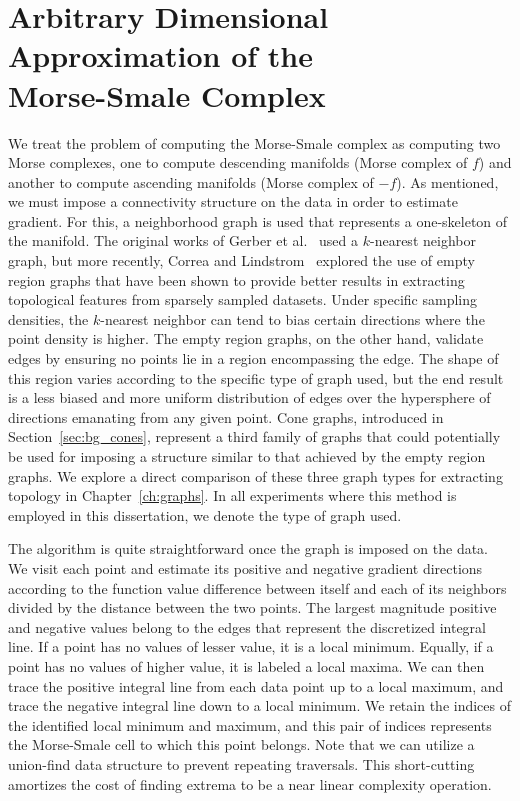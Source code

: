 \clearpage
\section{Arbitrary Dimensional Approximation of the\\Morse-Smale Complex}
\label{sec:approximationMSC}

We treat the problem of computing the Morse-Smale complex as computing two Morse complexes, one to compute descending manifolds (Morse complex of $f$) and another to compute ascending manifolds (Morse complex of $-f$).
%
As mentioned, we must impose a connectivity structure on the data in order to estimate gradient.
%
For this, a neighborhood graph is used that represents a one-skeleton of the manifold.
%
The original works of Gerber et al.~\cite{GerberBremerPascucci2010,GerberPotter2012,GerberRubelBremer2011} used a $k$-nearest neighbor graph, but more recently, Correa and Lindstrom~\cite{CorreaLindstrom2011} explored the use of empty region graphs that have been shown to provide better results in extracting topological features from sparsely sampled datasets.
%
Under specific sampling densities, the $k$-nearest neighbor can tend to bias certain directions where the point density is higher.
%
The empty region graphs, on the other hand, validate edges by ensuring no points lie in a region encompassing the edge.
%
The shape of this region varies according to the specific type of graph used, but the end result is a less biased and more uniform distribution of edges over the hypersphere of directions emanating from any given point.
%
Cone graphs, introduced in Section~\ref{sec:bg_cones}, represent a third family of graphs that could potentially be used for imposing a structure similar to that achieved by the empty region graphs.
%
We explore a direct comparison of these three graph types for extracting topology in Chapter~\ref{ch:graphs}.
%
In all experiments where this method is employed in this dissertation, we denote the type of graph used.

The algorithm is quite straightforward once the graph is imposed on the data.
%
We visit each point and estimate its positive and negative gradient directions according to the function value difference between itself and each of its neighbors divided by the distance between the two points.
%
The largest magnitude positive and negative values belong to the edges that represent the discretized integral line.
%
If a point has no values of lesser value, it is a local minimum.
%
Equally, if a point has no values of higher value, it is labeled a local maxima.
%
We can then trace the positive integral line from each data point up to a local maximum, and trace the negative integral line down to a local minimum.
%
We retain the indices of the identified local minimum and maximum, and this pair of indices represents the Morse-Smale cell to which this point belongs.
%
Note that we can utilize a union-find data structure to prevent repeating traversals.
%
This short-cutting amortizes the cost of finding extrema to be a near linear complexity operation.

